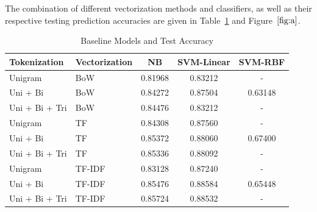 \documentclass{article}
\begin{document}
The combination of different vectorization methods and classifiers, as well as their respective testing prediction accuracies are given in Table~\ref{tab:a} and Figure~$\ref{fig:a}$.

\begin{table}[h]
   \centering
  \begin{tabular}{ l l|| c | c | c} 
     \toprule
    Tokenization  & Vectorization & NB & SVM-Linear & SVM-RBF  \\

    \midrule
    Unigram  & BoW  & 0.81968   & 0.83212      & -        \\
    Uni + Bi & BoW  & 0.84272    & 0.87504       & 0.63148          \\
    Uni + Bi + Tri & BoW  & 0.84476  & 0.83212      & -       \\
    Unigram  & TF  & 0.84308    & 0.87560      & -    \\
    Uni + Bi & TF & 0.85372     & 0.88060       & 0.67400      \\
    Uni + Bi + Tri & TF  & 0.85336  & 0.88092     & -     \\
    Unigram  & TF-IDF  & 0.83128    & 0.87240      & -    \\
    Uni + Bi & TF-IDF  & 0.85476      & 0.88584       & 0.65448    \\
    Uni + Bi + Tri & TF-IDF   & 0.85724  & 0.88532     & -    \\
    \bottomrule
  \end{tabular}
   \caption{Baseline Models and Test Accuracy}\label{tab:a}
\end{table}
\end{document}

